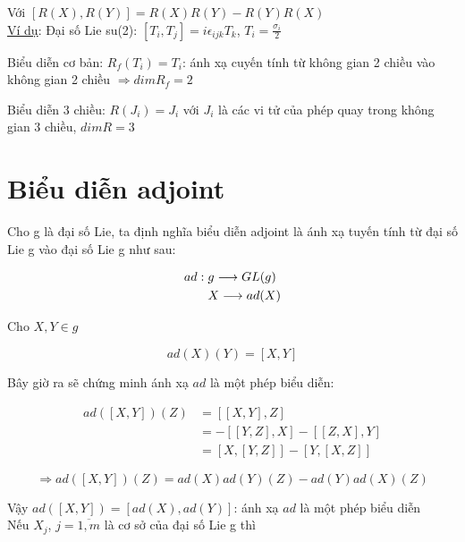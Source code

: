 \documentclass{report}
\begin{document}
Với \( \left[ R(X), R(Y) \right] = R(X)R(Y) - R(Y)R(X) \)\\

\underline{Ví dụ}: Đại số Lie su(2): \( \left[ T_{i}, T_{j} \right] = i \epsilon_{ijk} T_{k} \), \( T_{i} = \frac{\sigma_{i}}{2} \)

Biểu diễn cơ bản: \( R_{f}(T_{i}) = T_{i} \): ánh xạ cuyến tính từ không gian 2 chiều vào không gian 2 chiều \( \Rightarrow dim R_{f} = 2 \)

Biểu diễn 3 chiều: \( R(J_{i}) = J_{i} \) với \( J_{i} \) là các vi tử của phép quay trong không gian 3 chiều, \( dim R = 3 \)

\section{Biểu diễn adjoint}

Cho g là đại số Lie, ta định nghĩa biểu diễn adjoint là ánh xạ tuyến tính từ đại số Lie g vào đại số Lie g như sau: 

	\begin{align*}
		ad: \hspace*{1mm} & g \longrightarrow GL(g) \\
		& X \longrightarrow ad(X)
	\end{align*}
	
Cho \( X, Y \in g \)

\[ ad(X)(Y) = \left[X, Y \right] \]

Bây giờ ra sẽ chứng minh ánh xạ \( ad \) là một phép biểu diễn:

	\begin{align*}
		ad \left( \left[ X, Y \right] \right) \left( Z \right) & = \left[ \left[ X, Y \right], Z \right] \\
		& = - \left[ \left[ Y, Z \right], X \right] - \left[ \left[ Z, X \right], Y \right] \\
		& = \left[ X, \left[ Y, Z \right] \right] - \left[ Y, \left[ X, Z \right] \right]
	\end{align*}
	
\[ \Rightarrow ad \left( \left[ X, Y \right] \right) \left( Z \right) = ad(X)ad(Y)\left( Z \right) -  ad(Y)ad(X)\left( Z \right) \]

Vậy \(	ad \left( \left[ X, Y \right] \right) =  \left[ ad(X), ad(Y) \right] \): ánh xạ \( ad\) là một phép biểu diễn \\

Nếu  \( X_{j} \), \( j = \overline{1, m} \) là cơ sở của đại số Lie g thì
\end{document}
